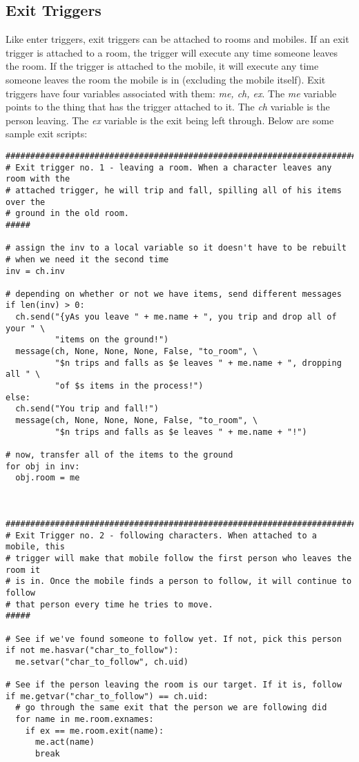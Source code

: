 \documentclass[12pt]{article}
\begin{document}
\subsection{Exit Triggers}
Like enter triggers, exit triggers can be attached to rooms and mobiles. If an exit trigger is attached to a room, the trigger will execute any time someone leaves the room. If the trigger is attached to the mobile, it will execute any time someone leaves the room the mobile is in (excluding the mobile itself). Exit triggers have four variables associated with them: {\it me, ch, ex}. The {\it me} variable points to the thing that has the trigger attached to it. The {\it ch} variable is the person leaving. The {\it ex} variable is the exit being left through. Below are some sample exit scripts:


{\bf \begin{verbatim}
###############################################################################
# Exit trigger no. 1 - leaving a room. When a character leaves any room with the
# attached trigger, he will trip and fall, spilling all of his items over the
# ground in the old room.
#####

# assign the inv to a local variable so it doesn't have to be rebuilt
# when we need it the second time
inv = ch.inv

# depending on whether or not we have items, send different messages
if len(inv) > 0:
  ch.send("{yAs you leave " + me.name + ", you trip and drop all of your " \
          "items on the ground!")
  message(ch, None, None, None, False, "to_room", \
          "$n trips and falls as $e leaves " + me.name + ", dropping all " \
          "of $s items in the process!")
else:
  ch.send("You trip and fall!")
  message(ch, None, None, None, False, "to_room", \
          "$n trips and falls as $e leaves " + me.name + "!")

# now, transfer all of the items to the ground
for obj in inv:
  obj.room = me



###############################################################################
# Exit Trigger no. 2 - following characters. When attached to a mobile, this
# trigger will make that mobile follow the first person who leaves the room it
# is in. Once the mobile finds a person to follow, it will continue to follow
# that person every time he tries to move.
#####

# See if we've found someone to follow yet. If not, pick this person
if not me.hasvar("char_to_follow"):
  me.setvar("char_to_follow", ch.uid)
  
# See if the person leaving the room is our target. If it is, follow
if me.getvar("char_to_follow") == ch.uid:
  # go through the same exit that the person we are following did
  for name in me.room.exnames:
    if ex == me.room.exit(name):
      me.act(name)
      break
\end{verbatim}}
\end{document}
